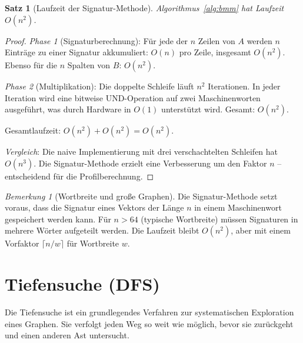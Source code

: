 ﻿\documentclass[a4paper,12pt,openany,oneside]{book}
\theoremstyle{definition}
\theoremstyle{plain}
\newtheorem{satz}{Satz}[chapter]
\theoremstyle{remark}
\newtheorem{bemerkung}{Bemerkung}[chapter]
\begin{document}
\begin{satz}[Laufzeit der Signatur-Methode]
  Algorithmus~\ref{alg:bmm} hat Laufzeit $O(n^2)$.
\end{satz}

\begin{proof}
  \emph{Phase 1} (Signaturberechnung):
  F\"ur jede der $n$ Zeilen von $A$ werden $n$ Eintr\"age zu einer
  Signatur akkumuliert: $O(n)$ pro Zeile, insgesamt $O(n^2)$.
  Ebenso f\"ur die $n$ Spalten von $B$: $O(n^2)$.

  \emph{Phase 2} (Multiplikation): Die doppelte Schleife l\"auft $n^2$
  Iterationen. In jeder Iteration wird eine bitweise UND-Operation auf
  zwei Maschinenworten ausgef\"uhrt, was durch Hardware in $O(1)$
  unterst\"utzt wird. Gesamt: $O(n^2)$.

  Gesamtlaufzeit: $O(n^2) + O(n^2) = O(n^2)$.

  \emph{Vergleich}: Die naive Implementierung mit drei verschachtelten
  Schleifen hat $O(n^3)$. Die Signatur-Methode erzielt eine Verbesserung
  um den Faktor $n$ -- entscheidend f\"ur die Profilberechnung.
\end{proof}

\begin{bemerkung}[Wortbreite und gro\ss{}e Graphen]
  Die Signatur-Methode setzt voraus, dass die Signatur eines Vektors
  der L\"ange $n$ in einem Maschinenwort gespeichert werden kann.
  F\"ur $n > 64$ (typische Wortbreite) m\"ussen Signaturen in mehrere
  W\"orter aufgeteilt werden. Die Laufzeit bleibt $O(n^2)$, aber mit
  einem Vorfaktor $\lceil n/w \rceil$ f\"ur Wortbreite $w$.
\end{bemerkung}

\section{Tiefensuche (DFS)}

Die Tiefensuche ist ein grundlegendes Verfahren zur systematischen
Exploration eines Graphen. Sie verfolgt jeden Weg so weit wie m\"oglich,
bevor sie zur\"uckgeht und einen anderen Ast untersucht.
\end{document}
